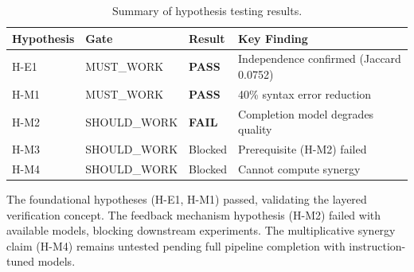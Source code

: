 \begin{table}[h]
\centering
\begin{tabular}{llll}
\toprule
Hypothesis & Gate & Result & Key Finding \\
\midrule
H-E1 & MUST\_WORK & \textbf{PASS} & Independence confirmed (Jaccard 0.0752) \\
H-M1 & MUST\_WORK & \textbf{PASS} & 40\% syntax error reduction \\
H-M2 & SHOULD\_WORK & \textbf{FAIL} & Completion model degrades quality \\
H-M3 & SHOULD\_WORK & Blocked & Prerequisite (H-M2) failed \\
H-M4 & SHOULD\_WORK & Blocked & Cannot compute synergy \\
\bottomrule
\end{tabular}
\caption{Summary of hypothesis testing results.}
\label{tab:summary}
\end{table}

The foundational hypotheses (H-E1, H-M1) passed, validating the layered verification concept. The feedback mechanism hypothesis (H-M2) failed with available models, blocking downstream experiments. The multiplicative synergy claim (H-M4) remains untested pending full pipeline completion with instruction-tuned models.
